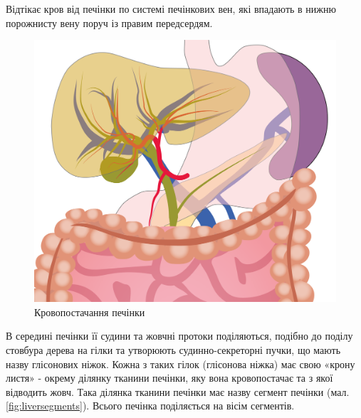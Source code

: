 Відтікає кров від печінки по системі печінкових вен, які впадають в нижню порожнисту вену поруч із правим передсердям. 


\newpage

\begin{figure}[h]
  \includegraphics[width=\linewidth]{Figures/Liver vasculature_Liver and guts.png}%
  \caption{Кровопостачання печінки}%
  \label{fig:livervasculature}%
\end{figure}

В середині печінки її судини та жовчні протоки поділяються, подібно до поділу стовбура дерева на гілки та утворюють судинно-секреторні пучки, що мають назву глісонових ніжок. Кожна з таких гілок (глісонова ніжка) має свою «крону листя» - окрему ділянку тканини печінки, яку вона кровопостачає та з якої відводить жовч.  Така ділянка тканини печінки має назву сегмент печінки (мал. \ref{fig:liversegments}). Всього печінка поділяється на вісім сегментів. 

